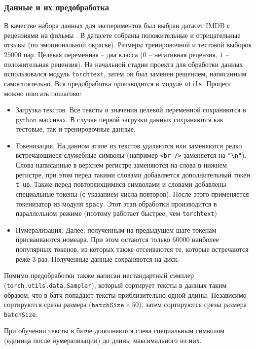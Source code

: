 \documentclass[12pt]{article}
\begin{document}
\subsubsection*{Данные и их предобработка}
В качестве набора данных для экспериментов был выбран датасет IMDB с рецензиями на фильмы \cite{maas-EtAl:2011:ACL-HLT2011}. В датасете собраны положительные
и отрицательные отзывы (по эмоциональной окраске). Размеры тренировочной и тестовой выборок $25000$ пар. Целевая переменная -- два класса 
($0$ -- негативная рецензия, $1$ -- положительная рецензия). На начальной стадии проекта для обработки данных использовался
модуль \texttt{torchtext}, затем он был заменен решением, написанным самостоятельно. Вся предобработка производится в модуле \texttt{utils}. Процесс можно описать пошагово:
\begin{itemize}
  \item
  Загрузка текстов. Все тексты и значения целевой переменной сохраняются в python массивах. В случае первой загрузки данных
  сохраняются как тестовые, так и тренировочные данные.
  \item
    Токенизация. На данном этапе из текстов удаляются или заменяются редко встречающиеся служебные символы (например \texttt{<br />} заменяется на \texttt{"\textbackslash n"}).
    Слова написанные в верхнем регистре заменяются на слова в нижнем регистре, при этом перед такими словами добавляется дополнительный токен \texttt{t\_up}. Также перед повторяющимися
    символами и словами добавлены специальные токены (с указанием числа повторов). После этого применяется токенизатор из модуля \texttt{spacy}. Этот этап обработки производится в параллельном 
    режиме (поэтому работает быстрее, чем \texttt{torchtext})
  \item Нумерализация. Далее, полученным на предыдущем шаге токенам присваиваются номеара. При этом остаются только
  $60000$ наиболее популярных токенов, из которых также отсеиваются те, которые встречаются реже $3$ раз. Полученные данные сохраняются на диск.
\end{itemize}
Помимо предобработки также написан нестандартный сэмплер (\texttt{torch.utils.data.Sampler}), который сортирует тексты в данных таким образом, что в батч попадают тексты
приблизительно одной длины. Независимо сортируются срезы размера ($\mathtt{batchSize} \times 50$), затем сортируются срезы размера \texttt{batchSize}.

При обучении тексты в батче дополняются слева специальным символом (единица после нумерализации) до длины максимального из них.
\end{document}
